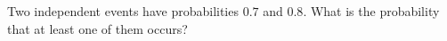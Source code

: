 Two independent events have probabilities $0.7$ and $0.8$. What is the probability that at least one of them occurs?
